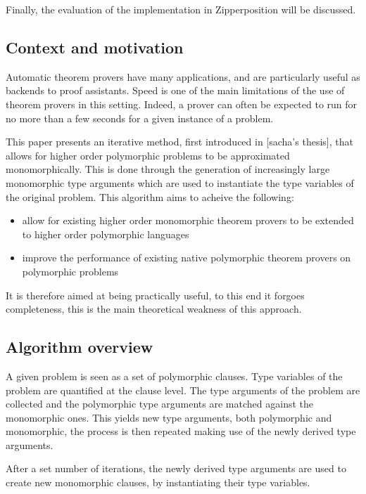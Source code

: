 \documentclass[]{ceurart}
\begin{document}
Finally, the evaluation of the implementation in Zipperposition will be discussed.

\subsection{Context and motivation}
Automatic theorem provers have many applications, and are particularly useful as backends to proof assistants. Speed is one of the main limitations of the use of theorem provers in this setting. Indeed, a prover can often be expected to run for no more than a few seconds for a given instance of a problem.

This paper presents an iterative method, first introduced in [sacha's thesis], that allows for higher order polymorphic problems to be approximated monomorphically. This is done through the generation of increasingly large monomorphic type arguments which are used to instantiate the type variables of the original problem. This algorithm aims to acheive the following:
   \begin{itemize}
      \item allow for existing higher order monomorphic theorem provers to be extended to higher order polymorphic languages
      \item improve the performance of existing native polymorphic theorem provers on polymorphic problems
   \end{itemize}

It is therefore aimed at being practically useful, to this end it forgoes completeness, this is the main theoretical weakness of this approach.

\subsection{Algorithm overview}
A given problem is seen as a set of polymorphic clauses. Type variables of the problem are quantified at the clause level. The type arguments of the problem are collected and the polymorphic type arguments are matched against the monomorphic ones. This yields new type arguments, both polymorphic and monomorphic, the process is then repeated making use of the newly derived type arguments.

After a set number of iterations, the newly derived type arguments are used to create new monomorphic clauses, by instantiating their type variables.
   
\end{document}

